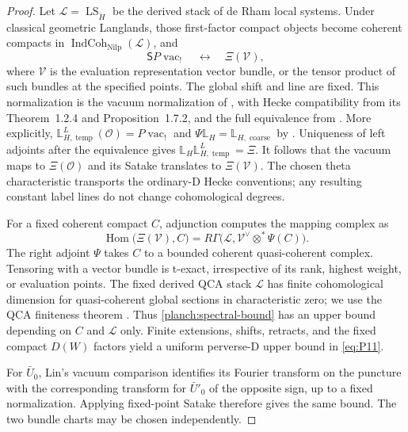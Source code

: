\documentclass[11pt]{article}
\numberwithin{equation}{section}
\theoremstyle{definition}
\theoremstyle{remark}
\begin{document}
\begin{proof}
Let $\mathcal L=\operatorname{LS}_{\check H}$ be the derived stack
of de Rham local systems.  Under classical geometric Langlands,
those first-factor compact objects become coherent compacts in
$\operatorname{IndCoh}_{\operatorname{Nilp}}(\mathcal L)$, and
\[
 \mathsf S P\operatorname{vac}_!
 \quad\longleftrightarrow\quad
 \Xi(\mathcal V),
\]
where $\mathcal V$ is the evaluation representation vector bundle,
or the tensor product of such bundles at the specified points.
The global shift and line are fixed.  This normalization is the
vacuum normalization of \cite[Sections~1.3--1.4]{GLCI}, with Hecke
compatibility from its Theorem~1.2.4 and Proposition~1.7.2, and the full equivalence from
\cite{GLCV}.  More explicitly,
$\mathbb L^L_{H,\operatorname{temp}}(\mathcal O)
=P\operatorname{vac}_!$ and
$\Psi\mathbb L_H=\mathbb L_{H,\operatorname{coarse}}$ by
\cite[Corollary~1.6.5]{GLCI}.  Uniqueness of left adjoints after the
equivalence gives
$\mathbb L_H\mathbb L^L_{H,\operatorname{temp}}=\Xi$.
It follows that the vacuum maps to $\Xi(\mathcal O)$ and its
Satake translates to $\Xi(\mathcal V)$.
The chosen theta characteristic transports the ordinary-D Hecke
conventions; any resulting constant label lines do not change
cohomological degrees.

For a fixed coherent compact $C$, adjunction computes the mapping
complex as
\begin{equation}
 \operatorname{Hom}\bigl(\Xi(\mathcal V),C\bigr)
   =R\Gamma\bigl(\mathcal L,
                    \mathcal V^\vee\otimes^*\Psi(C)\bigr).
 \label{planch:spectral-bound}
\end{equation}
The right adjoint $\Psi$ takes $C$ to a bounded coherent
quasi-coherent complex.  Tensoring with a vector bundle is t-exact,
irrespective of its rank, highest weight, or evaluation points.
The fixed derived QCA stack $\mathcal L$ has finite cohomological
dimension for quasi-coherent global sections in characteristic
zero; we use the QCA finiteness theorem
\cite{DrinfeldGaitsgoryFiniteness}.  Thus
\eqref{planch:spectral-bound} has an upper bound depending on $C$
and $\mathcal L$ only.  Finite extensions, shifts, retracts, and
the fixed compact $D(W)$ factors yield a uniform perverse-D upper
bound in \eqref{eq:P11}.

For $\bar U_0$, Lin's vacuum comparison identifies its Fourier
transform on the puncture with the corresponding transform for
$\bar U'_0$ of the opposite sign, up to a fixed normalization.
Applying fixed-point Satake therefore gives the same bound.  The two
bundle charts may be chosen independently.


\end{proof}
\end{document}
